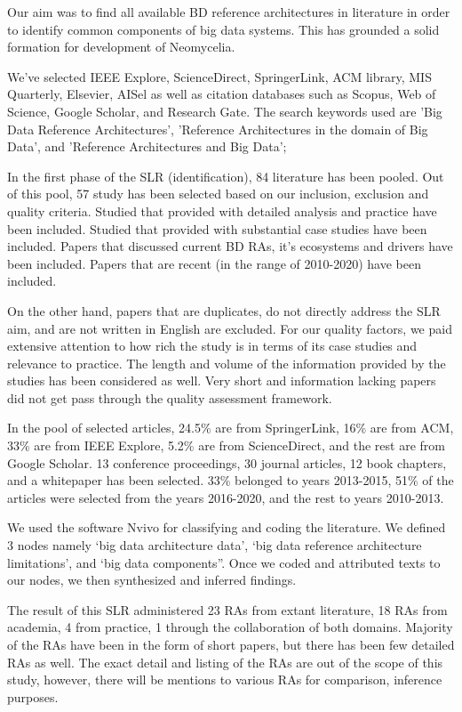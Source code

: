 \documentclass[10pt, conference]{IEEEtran}
\begin{document}
Our aim was to find all available BD reference architectures in literature in order to identify common components of big data systems. This has grounded a solid formation for development of Neomycelia.

We’ve selected IEEE Explore, ScienceDirect, SpringerLink, ACM library, MIS Quarterly, Elsevier, AISel as well as citation databases such as Scopus, Web of Science, Google Scholar, and Research Gate. The search keywords used are 'Big Data Reference Architectures', 'Reference Architectures in the domain of Big Data', and 'Reference Architectures and Big Data';

In the first phase of the SLR (identification), 84 literature has been pooled. Out of this pool, 57 study has been selected based on our inclusion, exclusion and quality criteria. Studied that provided with detailed analysis and practice have been included. Studied that provided with substantial case studies have been included. Papers that discussed current BD RAs, it’s ecosystems and drivers have been included. Papers that are recent (in the range of 2010-2020) have been included.

On the other hand, papers that are duplicates, do not directly address the SLR aim, and are not written in English are excluded. For our quality factors, we paid extensive attention to how rich the study is in terms of its case studies and relevance to practice. The length and volume of the information provided by the studies has been considered as well. Very short and information lacking papers did not get pass through the quality assessment framework.

In the pool of selected articles, 24.5\% are from SpringerLink, 16\% are from ACM, 33\% are from IEEE Explore, 5.2\% are from ScienceDirect, and the rest are from Google Scholar. 13 conference proceedings, 30 journal articles, 12 book chapters, and a whitepaper has been selected. 33\% belonged to years 2013-2015, 51\% of the articles were selected from the years 2016-2020, and the rest to years 2010-2013.

We used the software Nvivo for classifying and coding the literature. We defined 3 nodes namely ‘big data architecture data’, ‘big data reference architecture limitations’, and ‘big data components”. Once we coded and attributed texts to our nodes, we then synthesized and inferred findings.

The result of this SLR administered 23 RAs from extant literature, 18 RAs from academia, 4 from practice, 1 through the collaboration of both domains. Majority of the RAs have been in the form of short papers, but there has been few detailed RAs as well. The exact detail and listing of the RAs are out of the scope of this study, however, there will be mentions to various RAs for comparison, inference purposes.
\end{document}
